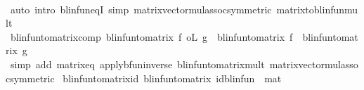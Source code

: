 \begin{isabellebody}
%
\isadelimproof
\ \ %
\endisadelimproof
%
\isatagproof
{}\isamarkupfalse%
\ {\isacharparenleft}{\kern0pt}auto\ intro{\isacharbang}{\kern0pt}{\isacharcolon}{\kern0pt}\ blinfun{\isacharunderscore}{\kern0pt}eqI\ simp{\isacharcolon}{\kern0pt}\ matrix{\isacharunderscore}{\kern0pt}vector{\isacharunderscore}{\kern0pt}mul{\isacharunderscore}{\kern0pt}assoc{\isacharbrackleft}{\kern0pt}symmetric{\isacharbrackright}{\kern0pt}\ matrix{\isacharunderscore}{\kern0pt}to{\isacharunderscore}{\kern0pt}blinfun{\isacharunderscore}{\kern0pt}mult{\isacharparenright}{\kern0pt}%
\endisatagproof
{\isafoldproof}%
%
\isadelimproof
\isanewline
%
\endisadelimproof
\isanewline
{}\isamarkupfalse%
\ blinfun{\isacharunderscore}{\kern0pt}to{\isacharunderscore}{\kern0pt}matrix{\isacharunderscore}{\kern0pt}comp{\isacharcolon}{\kern0pt}\ {\isachardoublequoteopen}blinfun{\isacharunderscore}{\kern0pt}to{\isacharunderscore}{\kern0pt}matrix\ {\isacharparenleft}{\kern0pt}f\ o\isactrlsub L\ g{\isacharparenright}{\kern0pt}\ {\isacharequal}{\kern0pt}\ {\isacharparenleft}{\kern0pt}blinfun{\isacharunderscore}{\kern0pt}to{\isacharunderscore}{\kern0pt}matrix\ f{\isacharparenright}{\kern0pt}\ {\isacharasterisk}{\kern0pt}{\isacharasterisk}{\kern0pt}\ {\isacharparenleft}{\kern0pt}blinfun{\isacharunderscore}{\kern0pt}to{\isacharunderscore}{\kern0pt}matrix\ g{\isacharparenright}{\kern0pt}{\isachardoublequoteclose}\isanewline
%
\isadelimproof
\ \ %
\endisadelimproof
%
\isatagproof
{}\isamarkupfalse%
\ {\isacharparenleft}{\kern0pt}simp\ add{\isacharcolon}{\kern0pt}\ matrix{\isacharunderscore}{\kern0pt}eq\ apply{\isacharunderscore}{\kern0pt}bfun{\isacharunderscore}{\kern0pt}inverse\ blinfun{\isacharunderscore}{\kern0pt}to{\isacharunderscore}{\kern0pt}matrix{\isacharunderscore}{\kern0pt}mult{\isacharprime}{\kern0pt}{\isacharprime}{\kern0pt}\ matrix{\isacharunderscore}{\kern0pt}vector{\isacharunderscore}{\kern0pt}mul{\isacharunderscore}{\kern0pt}assoc{\isacharbrackleft}{\kern0pt}symmetric{\isacharbrackright}{\kern0pt}{\isacharparenright}{\kern0pt}%
\endisatagproof
{\isafoldproof}%
%
\isadelimproof
\isanewline
%
\endisadelimproof
\isanewline
{}\isamarkupfalse%
\ blinfun{\isacharunderscore}{\kern0pt}to{\isacharunderscore}{\kern0pt}matrix{\isacharunderscore}{\kern0pt}id{\isacharcolon}{\kern0pt}\ {\isachardoublequoteopen}blinfun{\isacharunderscore}{\kern0pt}to{\isacharunderscore}{\kern0pt}matrix\ id{\isacharunderscore}{\kern0pt}blinfun\ {\isacharequal}{\kern0pt}\ mat\ {}{\isachardoublequoteclose}\isanewline
%
\isadelimproof
\ \ %
\endisadelimproof

\end{isabellebody}
